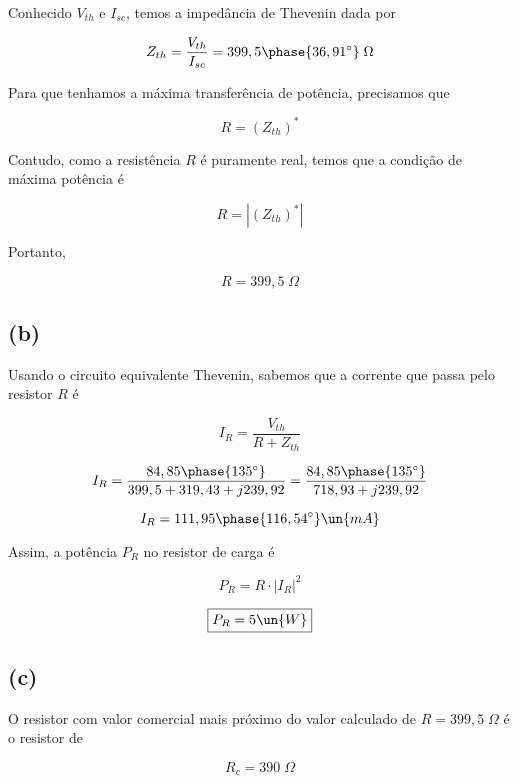 Conhecido $V_{th}$ e $I_{sc}$, temos a impedância de Thevenin dada por

\[ Z_{th} = \frac{V_{th}}{I_{sc}} = 399,5\phase{36,91^{\circ}} \;\Omega \]

Para que tenhamos a máxima transferência de potência, precisamos que

\[ R = (Z_{th})^* \]

Contudo, como a resistência $R$ é puramente real, temos que a condição de máxima potência é

\[ R = |(Z_{th})^*| \]

Portanto, 

\[ \boxed{R = 399,5 \;\Omega} \]

\subsection*{(b)}

Usando o circuito equivalente Thevenin, sabemos que a corrente que passa pelo resistor $R$ é

\[ I_R = \frac{V_{th}}{R + Z_{th}} \]

\[ I_R = \frac{84,85\phase{135^{\circ}}}{399,5 + 319,43 + j239,92} = \frac{84,85\phase{135^{\circ}}}{718,93 + j239,92} \]

\[ I_R = 111,95\phase{116,54^{\circ}} \un{mA} \]

Assim, a potência $P_R$ no resistor de carga é

\[ P_R = R \cdot |I_{R}|^2 \]

\[ \boxed{P_R = 5 \un{W}} \]

\subsection*{(c)}

O resistor com valor comercial mais próximo do valor calculado de $R = 399,5 \;\Omega$ é o resistor de

\[ \boxed{R_c = 390 \;\Omega} \]



